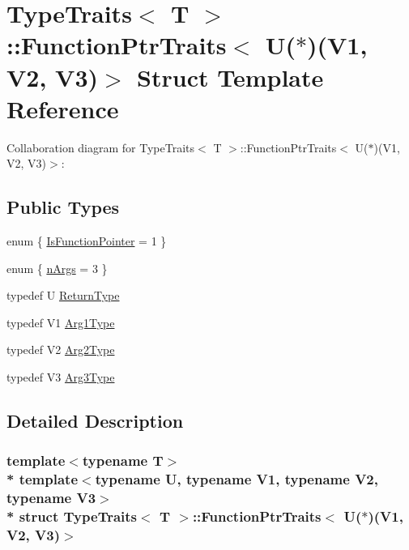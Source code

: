 \hypertarget{structTypeTraits_1_1FunctionPtrTraits_3_01U_07_5_08_07V1_00_01V2_00_01V3_08_4}{}\section{Type\+Traits$<$ T $>$\+:\+:Function\+Ptr\+Traits$<$ U($\ast$)(V1, V2, V3)$>$ Struct Template Reference}
\label{structTypeTraits_1_1FunctionPtrTraits_3_01U_07_5_08_07V1_00_01V2_00_01V3_08_4}


Collaboration diagram for Type\+Traits$<$ T $>$\+:\+:Function\+Ptr\+Traits$<$ U($\ast$)(V1, V2, V3)$>$\+:
\subsection*{Public Types}
\begin{DoxyCompactItemize}
\item 
enum \{ \hyperlink{structTypeTraits_1_1FunctionPtrTraits_3_01U_07_5_08_07V1_00_01V2_00_01V3_08_4_abb2f8fa09ff4ad1a559879200dcfe317a9d51542047f2e38642d83bab97244114}{Is\+Function\+Pointer} = 1
 \}
\item 
enum \{ \hyperlink{structTypeTraits_1_1FunctionPtrTraits_3_01U_07_5_08_07V1_00_01V2_00_01V3_08_4_aedb1a2523aeae926873e764a203341ddaa9ae8745b08305fa11f604e745f155f8}{n\+Args} = 3
 \}
\item 
typedef U \hyperlink{structTypeTraits_1_1FunctionPtrTraits_3_01U_07_5_08_07V1_00_01V2_00_01V3_08_4_a88c3eca3e997917909aea3d910097061}{Return\+Type}
\item 
typedef V1 \hyperlink{structTypeTraits_1_1FunctionPtrTraits_3_01U_07_5_08_07V1_00_01V2_00_01V3_08_4_aedbbbc4cf520ca916604118428257ae9}{Arg1\+Type}
\item 
typedef V2 \hyperlink{structTypeTraits_1_1FunctionPtrTraits_3_01U_07_5_08_07V1_00_01V2_00_01V3_08_4_a6a3b9b4a2ddab27b80a63da3b2ae1183}{Arg2\+Type}
\item 
typedef V3 \hyperlink{structTypeTraits_1_1FunctionPtrTraits_3_01U_07_5_08_07V1_00_01V2_00_01V3_08_4_a77f0f67698ea7246138937c2d460b562}{Arg3\+Type}
\end{DoxyCompactItemize}


\subsection{Detailed Description}
\subsubsection*{template$<$typename T$>$\\*
template$<$typename U, typename V1, typename V2, typename V3$>$\\*
struct Type\+Traits$<$ T $>$\+::\+Function\+Ptr\+Traits$<$ U($\ast$)(\+V1, V2, V3)$>$}

